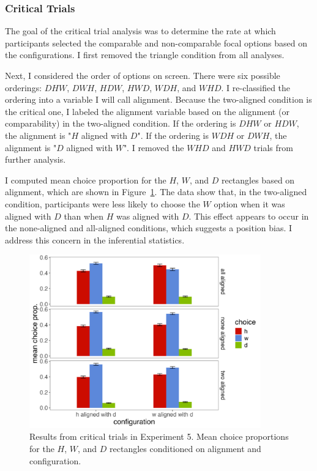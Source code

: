 \subsubsection{Critical Trials}

The goal of the critical trial analysis was to determine the rate at which participants selected the comparable and non-comparable focal options based on the configurations. I first removed the triangle condition from all analyses.

Next, I considered the order of options on screen. There were six possible orderings: $DHW$, $DWH$, $HDW$, $HWD$, $WDH$, and $WHD$. I re-classified the ordering into a variable I will call alignment. Because the two-aligned condition is the critical one, I labeled the alignment variable based on the alignment (or comparability) in the two-aligned condition. If the ordering is $DHW$ or $HDW$, the alignment is "$H$ aligned with $D$". If the ordering is $WDH$ or $DWH$, the alignment is "$D$ aligned with $W$". I removed the $WHD$ and $HWD$ trials from further analysis.

I computed mean choice proportion for the $H$, $W$, and $D$ rectangles based on alignment, which are shown in Figure~\ref{fig:comparability_crit_mean_choices}. The data show that, in the two-aligned condition, participants were less likely to choose the $W$ option when it was aligned with $D$ than when $H$ was aligned with $D$. This effect appears to occur in the none-aligned and all-aligned conditions, which suggests a position bias. I address this concern in the inferential statistics.

\begin{figure}
   \includegraphics[width=100mm]{figures/comparability_crit_mean_hdw_choice_by_config_align.jpeg}
   \caption{Results from critical trials in Experiment 5. Mean choice proportions for the $H$, $W$, and $D$ rectangles conditioned on alignment and configuration.}
   \label{fig:comparability_crit_mean_choices}
\end{figure}

